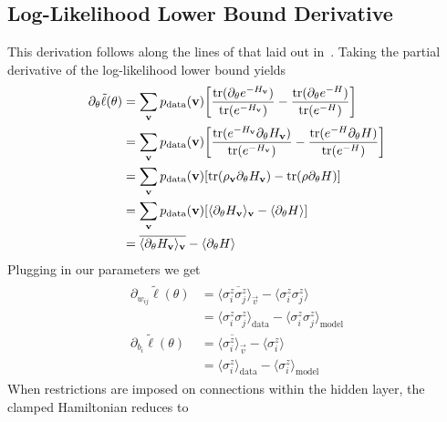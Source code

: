 \subsection{Log-Likelihood Lower Bound Derivative}\label{app:qbm_log_likelihood_lower_bound_derivative}
This derivation follows along the lines of that laid out in~\cite{amin_2018}.
Taking the partial derivative of the log-likelihood lower bound yields
\begin{align}
\begin{split}
    \label{eq:qbm_log_likelihood_derivative_lower_bound}
    \partial_\theta \tilde{\ell}(\theta)
        &= \sum_{\mathbf{v}} p_{\text{data}}(\mathbf{v}) \bigg[ \frac{\text{tr}(\partial_\theta e^{-H_{\mathbf{v}}})}{\text{tr}(e^{-H_{\mathbf{v}}})} - \frac{\text{tr}(\partial_\theta e^{-H})}{\text{tr}(e^{-H})} \bigg] \\
        &= \sum_{\mathbf{v}} p_{\text{data}}(\mathbf{v}) \bigg[ \frac{\text{tr}(e^{-H_{\mathbf{v}}} \partial_\theta H_{\mathbf{v}})}{\text{tr}(e^{-H_{\mathbf{v}}})} - \frac{\text{tr}(e^{-H} \partial_\theta H)}{\text{tr}(e^{-H})} \bigg] \\
        &= \sum_{\mathbf{v}} p_{\text{data}}(\mathbf{v}) [ \text{tr}(\rho_{\mathbf{v}} \partial_\theta H_{\mathbf{v}}) - \text{tr}(\rho \partial_\theta H) ] \\
        &= \sum_{\mathbf{v}} p_{\text{data}}(\mathbf{v}) [ \langle \partial_\theta H_{\mathbf{v}} \rangle_{\mathbf{v}} - \langle \partial_\theta H \rangle ] \\
        &= \overline{\langle \partial_\theta H_{\mathbf{v}} \rangle_{\mathbf{v}}} - \langle \partial_\theta H \rangle
\end{split}
\end{align}
Plugging in our parameters we get
\begin{align}
\begin{split}
    \partial_{w_{ij}} \tilde{\ell}(\theta)
        &= \overline{\langle \sigma_i^z \sigma_j^z \rangle_\vec{v}} - \langle \sigma_i^z \sigma_j^z \rangle \\
        &= \langle \sigma_i^z \sigma_j^z \rangle_\text{data} - \langle \sigma_i^z \sigma_j^z \rangle_\text{model} \\
    \partial_{b_i} \tilde{\ell}(\theta)
        &= \overline{\langle \sigma_i^z \rangle_\vec{v}} - \langle \sigma_i^z \rangle \\
        &= \langle \sigma_i^z \rangle_\text{data} - \langle \sigma_i^z \rangle_\text{model}
\end{split}
\end{align}
When restrictions are imposed on connections within the hidden layer, the clamped Hamiltonian reduces to
